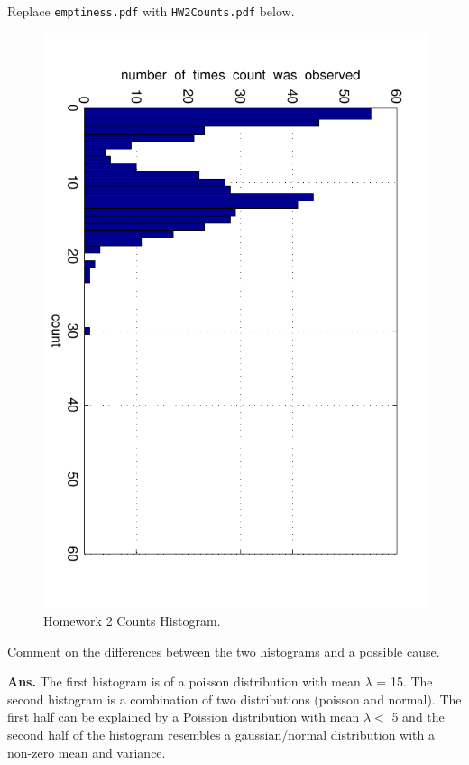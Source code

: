 \documentclass{article}
\begin{document}
{Replace \texttt{emptiness.pdf} with \texttt{HW2Counts.pdf} below.

\begin{figure}[H]
\begin{center}
\includegraphics[scale=0.5, angle=90]{HW2Counts.pdf}
\caption{Homework 2 Counts Histogram.}
\end{center}
\end{figure}
Comment on the differences between the two histograms and a possible cause.

\textbf{Ans.} The first histogram is of a poisson distribution with mean $\lambda$ = 15. The second histogram is a combination of two distributions (poisson and normal). The first half can be explained by a Poission distribution with mean $\lambda <$ 5 and the second half of the histogram resembles a gaussian/normal distribution with a non-zero mean and variance.

}
\end{document}

